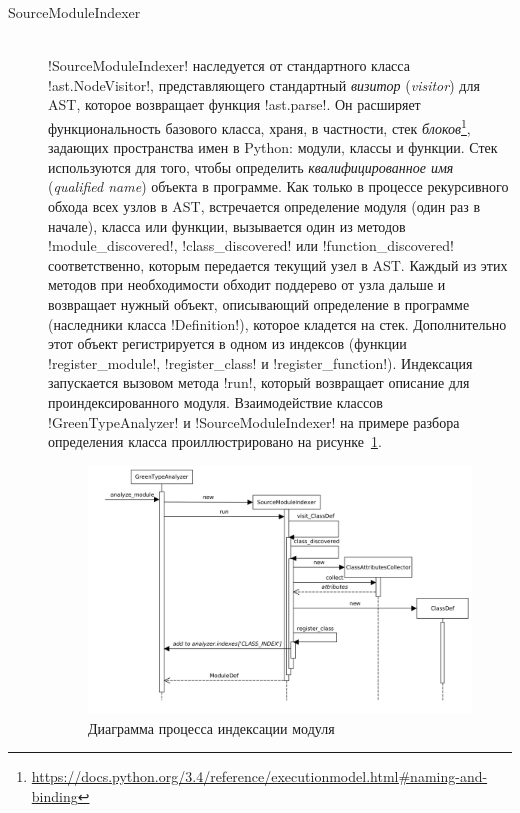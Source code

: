 \begin{description}
  \item[SourceModuleIndexer] \hfill \\ !SourceModuleIndexer! наследуется от
    стандартного класса !ast.NodeVisitor!, представляющего стандартный
    \emph{визитор} (\emph{visitor}) для AST, которое возвращает функция
    !ast.parse!. Он расширяет функциональность базового класса, храня, в
    частности, стек
    \emph{блоков}\footnote{\url{https://docs.python.org/3.4/reference/executionmodel.html\#naming-and-binding}},
    задающих пространства имен в Python: модули, классы и функции. Стек
    используются для того, чтобы определить \emph{квалифицированное имя}
    (\emph{qualified name}) объекта в программе.  Как только в процессе
    рекурсивного обхода всех узлов в AST, встречается определение модуля (один
    раз в начале), класса или функции, вызывается один из методов
    !module_discovered!, !class_discovered! или !function_discovered!
    соответственно, которым передается текущий узел в AST. Каждый из этих
    методов при необходимости обходит поддерево от узла дальше и возвращает
    нужный объект, описывающий определение в программе (наследники класса
    !Definition!), которое кладется на стек. Дополнительно этот объект
    регистрируется в одном из индексов
    (функции !register_module!, !register_class! и !register_function!).
    Индексация запускается вызовом метода !run!, который возвращает описание
    для проиндексированного модуля. Взаимодействие классов !GreenTypeAnalyzer! и
    !SourceModuleIndexer! на примере разбора определения класса
    проиллюстрировано на рисунке~\ref{fig:indexing-diag}.

  \begin{figure}
  \begin{center}
      \includegraphics[width=\textwidth]{fig/indexing-diag.png}
  \end{center}
  \caption{Диаграмма процесса индексации модуля}
  \label{fig:indexing-diag}
  \end{figure}


\end{description}
